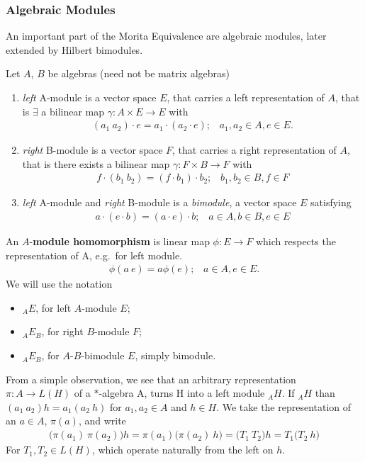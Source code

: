 \subsubsection{Algebraic Modules}
An important part of the Morita Equivalence are algebraic modules, later
extended by Hilbert bimodules.
\begin{mydefinition}
    Let $A$, $B$ be algebras (need not be matrix algebras)
    \begin{enumerate}
        \item \textit{left} A-module is a vector space $E$, that carries a left
            representation of $A$, that is $\exists$ a bilinear map $\gamma: A
            \times E \rightarrow E$ with
            \begin{align}
                (a_1\ a_2)\cdot e = a_1 \cdot (a_2 \cdot e);\;\;\; a_1, a_2 \in
                A, e \in E.
            \end{align}
        \item \textit{right} B-module is a vector space $F$, that carries a
            right representation of $A$, that is there exists a bilinear map
            $\gamma: F \times B \rightarrow F$ with
            \begin{align}
                f \cdot (b_1\ b_2)= (f \cdot b_1) \cdot b_2;\;\;\; b_1, b_2 \in B, f \in F
            \end{align}
        \item \textit{left} A-module and \textit{right} B-module is a
            \textit{bimodule}, a vector space $E$ satisfying
            \begin{align}
                a \cdot (e \cdot b)= (a \cdot e) \cdot b;\;\;\;  a \in A, b \in B, e \in E
            \end{align}
    \end{enumerate}
\end{mydefinition}
An $A$-\textbf{module homomorphism} is linear map $\phi: E\rightarrow F$ which respects the
representation of A, e.g.\ for left module.
\begin{align}
    \phi (a\ e) = a \phi (e); \;\;\; a \in A, e \in E.
\end{align}
We will use the notation
\begin{itemize}
    \item ${}_A E$, for left $A$-module $E$;
    \item ${}_A E_B$, for right $B$-module $F$;
    \item ${}_A E_B$, for $A$-$B$-bimodule $E$, simply bimodule.
\end{itemize}
From a simple observation, we see that an arbitrary representation $\pi : A
\rightarrow L(H)$ of a $*$-algebra A, turns H into a left module ${}_A H$.  If
$_A H$ than $(a_1\ a_2) h = a_1 (a_2\ h)$ for $a_1, a_2 \in A$ and $h \in H$. We
take the representation of an $a \in A$, $\pi (a)$, and write
\begin{align}
    \big(\pi(a_1)\ \pi(a_2)\big)h = \pi(a_1)\big(\pi(a_2)\ h\big) =
    \big(T_1\ T_2\big) h = T_1 \big(T_2\ h\big)
\end{align}
For $T_1, T_2 \in L(H)$, which operate naturally from the left on $h$.

